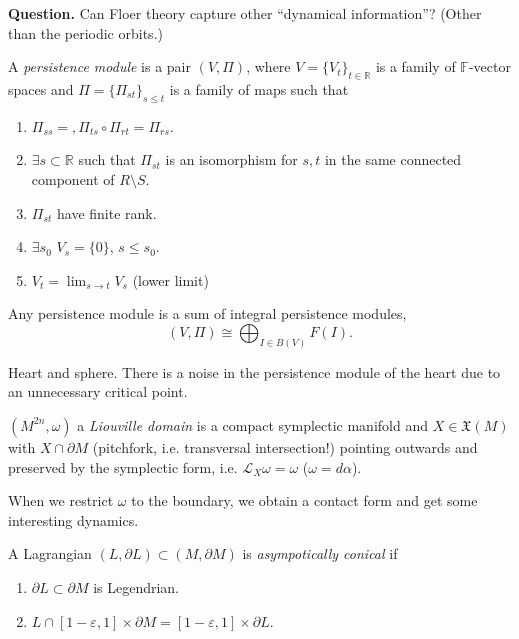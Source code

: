 \medskip\noindent
{\bf Question.} Can Floer theory capture
other ``dynamical information''?
(Other than the periodic orbits.)

\medskip\noindent
A {\it persistence module} is a pair
$(V,\Pi)$, where $V=\{V_t\}_{t \in
\mathbb{R}}$ is a family of
$\mathbb{F}$-vector spaces
and $\Pi=\{\Pi_{st}\}_{s \leq  t}$ is a
family of maps such that
\begin{enumerate}
\item $\Pi_{ss}=, \Pi_{ts}\circ
\Pi_{rt}=\Pi_{rs}$.
\item $\exists  s \subset \mathbb{R}$ such
that
$\Pi_{s t}$ is an isomorphism for $s,t$ in
the same connected component of
$R\setminus S$.
\item $\Pi_{s t}$ have finite rank.
\item $\exists s_0$ $V_s=\{0\}$, $s \leq
s_0$.
\item $V_t= \lim_{s \to t} V_s$ (lower
limit)
\end{enumerate}

\begin{theorem}
\label{theorem-persi-modul-sum-integ}
Any persistence module is a sum of integral
persistence modules,
$$
(V,\Pi) \cong \bigoplus_{I \in B(V)}F(I).
$$
\end{theorem}

\begin{example}
\label{example-hart-and-sphere}
Heart and sphere. There is a noise in the
persistence module
of the heart due to an unnecessary critical
point.
\end{example}

$(M^{2n},\omega)$ a {\it Liouville domain} is
a compact
symplectic manifold and $X \in
\mathfrak{X}(M)$
with $X \cap\partial M$ (pitchfork, i.e.
transversal intersection!)
pointing outwards
and preserved by the symplectic form, i.e.
$\mathcal{L}_X \omega=\omega$
($\omega=d \alpha$).

When we restrict $\omega$ to the boundary,
we obtain a contact form and get some
interesting dynamics.

A Lagrangian $(L,\partial L) \subset
(M,\partial M)$
is {\it asympotically conical} if
\begin{enumerate}
\item $\partial L \subset \partial M$ is
Legendrian.
\item $L \cap [1-\varepsilon,1] \times
\partial M=
[1-\varepsilon,1] \times \partial L$.
\end{enumerate}

